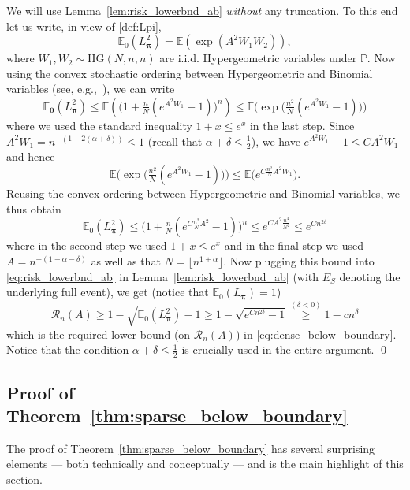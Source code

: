 \documentclass[11pt,reqno,letterpaper]{amsart}
\numberwithin{equation}{section}
\theoremstyle{plain}
\def \bpi{\boldsymbol{\pi}}
\def \E{\mathbb{E}}
\def \P{\mathbb{P}}
\begin{document}
 We will use 
Lemma~\ref{lem:risk_lowerbnd_ab} {\em without} any truncation. To this end let us 
write, in view of \eqref{def:Lpi},
\begin{equation*}
\E_0\left(L_{\bpi}^2\right)=\E(\exp(A^2W_1W_2)),
\end{equation*}
where $W_1, W_2 \sim \mathrm{HG}(N,n,n)$ are i.i.d. Hypergeometric variables under 
$\P$. Now using the convex stochastic ordering between Hypergeometric and Binomial 
variables (see, e.g.,~\citep{aldous2006exchangeability}), we can write
\begin{equation*}
\E_{\mathbf{0}}\left(L_{\bpi}^2\right) \le \E\left(\big(1 + \tfrac nN(e^{A^2W_1} - 1)\big)^n \right) \le \E\big(\exp\big(\tfrac{n^2}N (e^{A^2W_1} - 1) \big)\big)
\end{equation*}
where we used the standard inequality $1 + x \le e^x$ in the last step. Since $A^2 W_1 = n^{-(1 - 2(\alpha + \delta))} \le 1$ (recall that $\alpha + \delta \le \frac 12$), we have $e^{A^2W_1} - 1 \le CA^2W_1$ and hence
\begin{equation*}
\E\big(\exp\big(\tfrac{n^2}N (e^{A^2W_1} - 1) \big)\big) \le \E\big(e^{C\frac{n^2}NA^2W_1}\big).
\end{equation*}
Reusing the convex ordering between Hypergeometric and Binomial variables, we thus 
obtain
\begin{equation*}
\E_ 0\left(L_{\bpi}^2\right) \le \big(1+\tfrac{n}{N}(e^{C\frac{n^2}{N}A^2}-1)\big)^n \le e^{C A^2\frac{n^4}{N^2}} \le e^{C n^{2\delta}}
\end{equation*}
where in the second step we used $1 + x \le e^x$ and in the final step we used $A = n^{-(1 - \alpha - \delta)}$ as well as that $N = \lfloor n^{1 + \alpha}\rfloor$. 
Now plugging this bound into \eqref{eq:risk_lowerbnd_ab} in 
Lemma~\ref{lem:risk_lowerbnd_ab} (with $E_S$ denoting the underlying full event), 
we get (notice that $\E_0(L_{\bpi}) =  1$)
\begin{equation*}
\mathcal R_n(A) \ge 1-\sqrt{\E_0\left(L_{\bpi}^2\right)-1} \ge 1 - \sqrt{e^{Cn^{2\delta}} - 1} \stackrel{(\delta < 0)}{\ge} 1 - c n^{\delta}
\end{equation*}
 which is the required lower bound (on $\mathcal R_n(A)$) in \eqref{eq:dense_below_boundary}. Notice that the condition $\alpha + \delta \le 
 \frac 12$ is crucially used in the entire argument. \qed

\subsection{Proof of Theorem~\ref{thm:sparse_below_boundary}}\label{subsec:sparse_below}
The proof of Theorem~\ref{thm:sparse_below_boundary} has several surprising elements --- both technically and conceptually --- and is the main highlight of this section.
\end{document}
